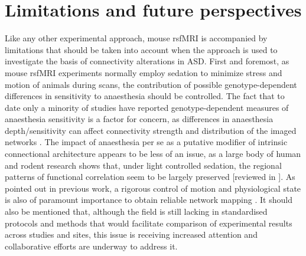 \section{Limitations and future perspectives}

Like any other experimental approach, mouse rsfMRI is accompanied by limitations
that should be taken into account when the approach is used to investigate the
basis of connectivity alterations in ASD. First and foremost, as mouse rsfMRI
experiments normally employ sedation to minimize stress and motion of animals
during scans, the contribution of possible genotype-dependent differences in
sensitivity to anaesthesia \parencite{petrinovic2016} should be controlled. The
fact that to date only a minority of studies \parencite{sforazzini2016,
zhan2014} have reported genotype-dependent measures of anaesthesia sensitivity
is a factor for concern, as differences in anaesthesia depth/sensitivity can
affect connectivity strength and distribution of the imaged networks
\parencite{nasrallah2014}. The impact of anaesthesia per se as a putative
modifier of intrinsic connectional architecture appears to be less of an issue,
as a large body of human and rodent research shows that, under light controlled
sedation, the regional patterns of functional correlation seem to be largely
preserved [reviewed in \parencite{gozzi2016}]. As pointed out in previous work,
a rigorous control of motion and physiological state is also of paramount
importance to obtain reliable network mapping \parencite{gozzi2016,
jonckers2015}. It should also be mentioned that, although the field is still
lacking in standardised protocols and methods that would facilitate comparison
of experimental results across studies and sites, this issue is receiving
increased attention and collaborative efforts are underway to address it.

